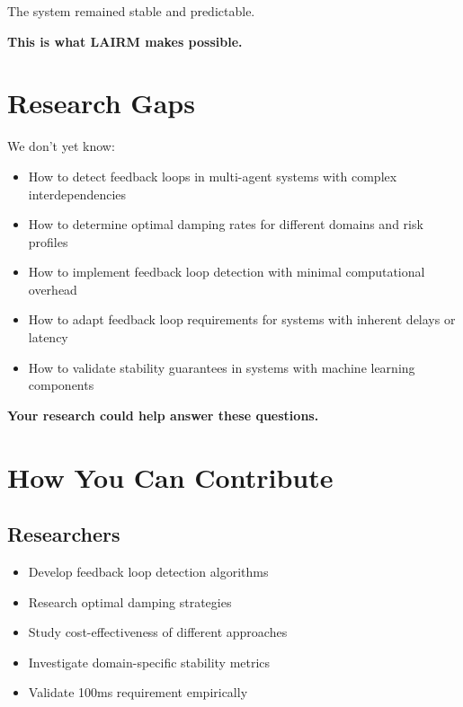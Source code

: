 The system remained stable and predictable.

\textbf{This is what LAIRM makes possible.}

\vspace{0.5cm}

\section{Research Gaps}

We don't yet know:

\begin{itemize}
    \item How to detect feedback loops in multi-agent systems with complex interdependencies
    
    \item How to determine optimal damping rates for different domains and risk profiles
    
    \item How to implement feedback loop detection with minimal computational overhead
    
    \item How to adapt feedback loop requirements for systems with inherent delays or latency
    
    \item How to validate stability guarantees in systems with machine learning components
\end{itemize}

\textbf{Your research could help answer these questions.}

\vspace{0.5cm}

\section{How You Can Contribute}

\subsection{Researchers}

\begin{itemize}
    \item Develop feedback loop detection algorithms
    \item Research optimal damping strategies
    \item Study cost-effectiveness of different approaches
    \item Investigate domain-specific stability metrics
    \item Validate 100ms requirement empirically
\end{itemize}

